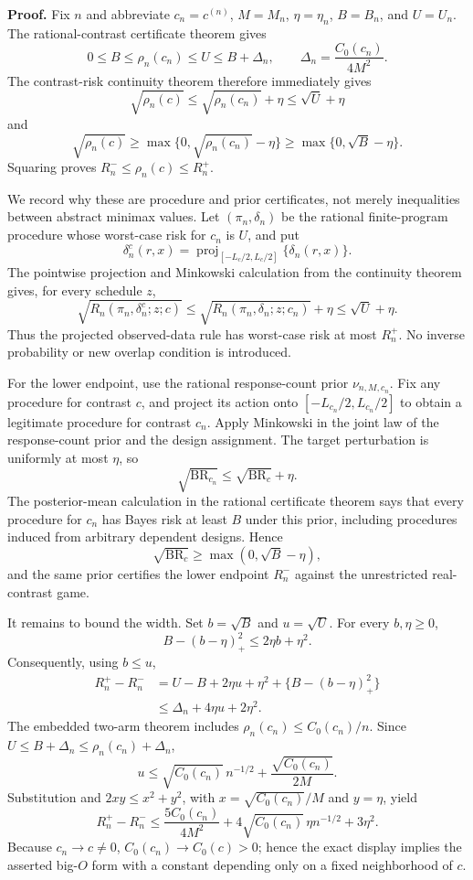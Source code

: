 \textbf{Proof.}
Fix \(n\) and abbreviate \(c_n=c^{(n)}\), \(M=M_n\), \(\eta=\eta_n\), \(B=B_n\), and \(U=U_n\).  The rational-contrast certificate theorem gives
\[
 0\leq B\leq\rho_n(c_n)\leq U
 \leq B+\Delta_n,
 \qquad
 \Delta_n=\frac{C_0(c_n)}{4M^2}.
\]
The contrast-risk continuity theorem therefore immediately gives
\[
 \sqrt{\rho_n(c)}
 \leq\sqrt{\rho_n(c_n)}+\eta
 \leq\sqrt U+\eta
\]
and
\[
 \sqrt{\rho_n(c)}
 \geq\max\{0,\sqrt{\rho_n(c_n)}-\eta\}
 \geq\max\{0,\sqrt B-\eta\}.
\]
Squaring proves \(R_n^-\leq\rho_n(c)\leq R_n^+\).

We record why these are procedure and prior certificates, not merely inequalities between abstract minimax values.  Let \((\pi_n,\delta_n)\) be the rational finite-program procedure whose worst-case risk for \(c_n\) is \(U\), and put
\[
 \delta_n^c(r,x)=\operatorname{proj}_{[-L_c/2,L_c/2]}\{\delta_n(r,x)\}.
\]
The pointwise projection and Minkowski calculation from the continuity theorem gives, for every schedule \(z\),
\[
 \sqrt{R_n(\pi_n,\delta_n^c;z;c)}
 \leq\sqrt{R_n(\pi_n,\delta_n;z;c_n)}+\eta
 \leq\sqrt U+\eta.
\]
Thus the projected observed-data rule has worst-case risk at most \(R_n^+\).  No inverse probability or new overlap condition is introduced.

For the lower endpoint, use the rational response-count prior \(\nu_{n,M,c_n}\).  Fix any procedure for contrast \(c\), and project its action onto \([-L_{c_n}/2,L_{c_n}/2]\) to obtain a legitimate procedure for contrast \(c_n\).  Apply Minkowski in the joint law of the response-count prior and the design assignment.  The target perturbation is uniformly at most \(\eta\), so
\[
 \sqrt{\operatorname{BR}_{c_n}}
 \leq\sqrt{\operatorname{BR}_{c}}+\eta.
\]
The posterior-mean calculation in the rational certificate theorem says that every procedure for \(c_n\) has Bayes risk at least \(B\) under this prior, including procedures induced from arbitrary dependent designs.  Hence
\[
 \sqrt{\operatorname{BR}_{c}}
 \geq\max(0,\sqrt B-\eta),
\]
and the same prior certifies the lower endpoint \(R_n^-\) against the unrestricted real-contrast game.

It remains to bound the width.  Set \(b=\sqrt B\) and \(u=\sqrt U\).  For every \(b,\eta\geq0\),
\[
 B-(b-\eta)_+^2\leq2\eta b+\eta^2.
\]
Consequently, using \(b\leq u\),
\[
 \begin{aligned}
 R_n^+-R_n^-
 &=U-B+2\eta u+\eta^2+\bigl\{B-(b-\eta)_+^2\bigr\}\\
 &\leq\Delta_n+4\eta u+2\eta^2.
 \end{aligned}
\]
The embedded two-arm theorem includes \(\rho_n(c_n)\leq C_0(c_n)/n\).  Since \(U\leq B+\Delta_n\leq\rho_n(c_n)+\Delta_n\),
\[
 u\leq\sqrt{C_0(c_n)}\,n^{-1/2}
 +\frac{\sqrt{C_0(c_n)}}{2M}.
\]
Substitution and \(2xy\leq x^2+y^2\), with \(x=\sqrt{C_0(c_n)}/M\) and \(y=\eta\), yield
\[
 R_n^+-R_n^-
 \leq\frac{5C_0(c_n)}{4M^2}
 +4\sqrt{C_0(c_n)}\,\eta n^{-1/2}
 +3\eta^2.
\]
Because \(c_n\to c\neq0\), \(C_0(c_n)\to C_0(c)>0\); hence the exact display implies the asserted big-\(O\) form with a constant depending only on a fixed neighborhood of \(c\).

